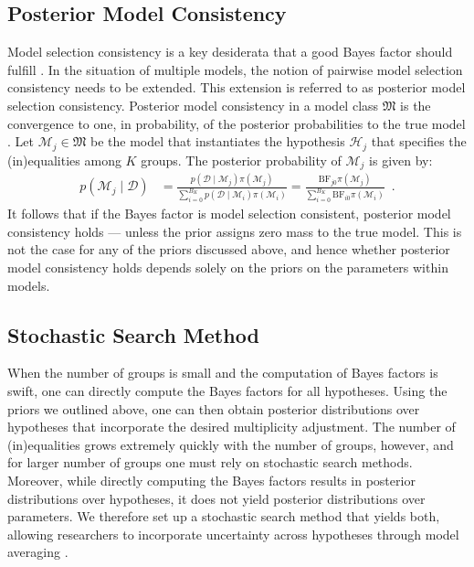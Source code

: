 \documentclass[11pt,a4paper]{article}
\theoremstyle{definition} %
\theoremstyle{case}
\newcommand{\bellnum}[1]{B_{#1}}
\begin{document}
\subsection{Posterior Model Consistency}
Model selection consistency is a key desiderata that a good Bayes factor should fulfill \parencite[e.g.,][]{bayarri2012criteria, ly2016harold, consonni2018prior}. In the situation of multiple models, the notion of pairwise model selection consistency needs to be extended. This extension is referred to as posterior model selection consistency. Posterior model consistency in a model class $\mathfrak{M}$ is the convergence to one, in probability, of the posterior probabilities to the true model \parencite[e.g.,][]{casella2009consistency, moreno2015posterior}. Let $\mathcal{M}_j \in \mathfrak{M}$ be the model that instantiates the hypothesis $\mathcal{H}_j$ that specifies the (in)equalities among $K$ groups. The posterior probability of $\mathcal{M}_j$ is given by:
\begin{align}
    p(\mathcal{M}_j \mid \mathcal{D}) &= \frac{p(\mathcal{D} \mid \mathcal{M}_j) \pi(\mathcal{M}_j)}{\sum_{i = 0}^{\bellnum{K}} p(\mathcal{D} \mid \mathcal{M}_i) \pi(\mathcal{M}_i)} 
    = \frac{\text{BF}_{j0}\pi(\mathcal{M}_j)}{\sum_{i = 0}^{\bellnum{K}} \text{BF}_{i0} \pi(\mathcal{M}_i)} \enspace .
\end{align}
It follows that if the Bayes factor is model selection consistent, posterior model consistency holds \parencite[see also][Theorem 1]{moreno2015posterior} --- unless the prior assigns zero mass to the true model. This is not the case for any of the priors discussed above, and hence whether posterior model consistency holds depends solely on the priors on the parameters within models.

\subsection{Stochastic Search Method} \label{sec:method-description}
When the number of groups is small and the computation of Bayes factors is swift, one can directly compute the Bayes factors for all hypotheses. Using the priors we outlined above, one can then obtain posterior distributions over hypotheses that incorporate the desired multiplicity adjustment. The number of (in)equalities grows extremely quickly with the number of groups, however, and for larger number of groups one must rely on stochastic search methods. Moreover, while directly computing the Bayes factors results in posterior distributions over hypotheses, it does not yield posterior distributions over parameters. We therefore set up a stochastic search method that yields both, allowing researchers to incorporate uncertainty across hypotheses through model averaging \parencite[e.g.,][]{hinne2020conceptual, hoeting1999bayesian}.
\end{document}
